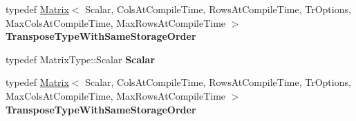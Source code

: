 \begin{DoxyCompactItemize}
typedef \hyperlink{group___core___module_class_eigen_1_1_matrix}{Matrix}$<$ Scalar, Cols\+At\+Compile\+Time, Rows\+At\+Compile\+Time, Tr\+Options, Max\+Cols\+At\+Compile\+Time, Max\+Rows\+At\+Compile\+Time $>$ {\bfseries Transpose\+Type\+With\+Same\+Storage\+Order}
\item 
\mbox{\label{class_eigen_1_1internal_1_1qr__preconditioner__impl_3_01_matrix_type_00_01_col_piv_householder_q9febbd0c27c13f65b619ca11d9f35cb8_a85b6c5ee23a5920211586a22d33c73a9}} 
typedef Matrix\+Type\+::\+Scalar {\bfseries Scalar}
\item 
\mbox{\label{class_eigen_1_1internal_1_1qr__preconditioner__impl_3_01_matrix_type_00_01_col_piv_householder_q9febbd0c27c13f65b619ca11d9f35cb8_a58578c89efb3fbe5e0356412694f873f}} 
typedef \hyperlink{group___core___module_class_eigen_1_1_matrix}{Matrix}$<$ Scalar, Cols\+At\+Compile\+Time, Rows\+At\+Compile\+Time, Tr\+Options, Max\+Cols\+At\+Compile\+Time, Max\+Rows\+At\+Compile\+Time $>$ {\bfseries Transpose\+Type\+With\+Same\+Storage\+Order}
\end{DoxyCompactItemize}
